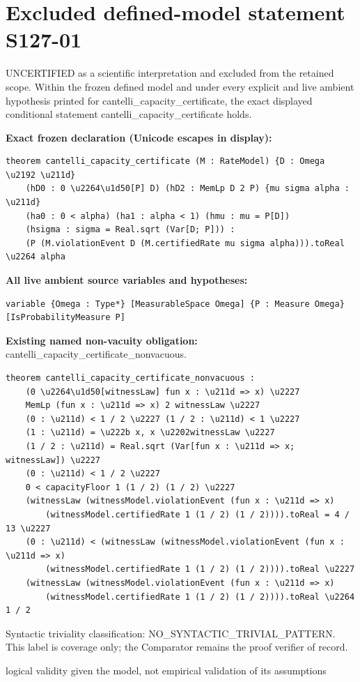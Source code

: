 \documentclass[11pt]{article}
\begin{document}
\section*{Excluded defined-model statement S127-01}
UNCERTIFIED as a scientific interpretation and excluded from the retained scope. Within the frozen defined model and under every explicit and live ambient hypothesis printed for cantelli\_\allowbreak{}capacity\_\allowbreak{}certificate, the exact displayed conditional statement cantelli\_\allowbreak{}capacity\_\allowbreak{}certificate holds.
\par\noindent\textbf{Exact frozen declaration (Unicode escapes in display):}
\begin{Verbatim}[breaklines=true,breakanywhere=true,fontsize=\scriptsize]
theorem cantelli_capacity_certificate (M : RateModel) {D : Omega \u2192 \u211d}
    (hD0 : 0 \u2264\u1d50[P] D) (hD2 : MemLp D 2 P) {mu sigma alpha : \u211d}
    (ha0 : 0 < alpha) (ha1 : alpha < 1) (hmu : mu = P[D])
    (hsigma : sigma = Real.sqrt (Var[D; P])) :
    (P (M.violationEvent D (M.certifiedRate mu sigma alpha))).toReal \u2264 alpha
\end{Verbatim}
\noindent\textbf{All live ambient source variables and hypotheses:}
\begin{Verbatim}[breaklines=true,breakanywhere=true,fontsize=\scriptsize]
variable {Omega : Type*} [MeasurableSpace Omega] {P : Measure Omega} [IsProbabilityMeasure P]
\end{Verbatim}
\noindent\textbf{Existing named non-vacuity obligation:} cantelli\_\allowbreak{}capacity\_\allowbreak{}certificate\_\allowbreak{}nonvacuous.
\begin{Verbatim}[breaklines=true,breakanywhere=true,fontsize=\scriptsize]
theorem cantelli_capacity_certificate_nonvacuous :
    (0 \u2264\u1d50[witnessLaw] fun x : \u211d => x) \u2227
    MemLp (fun x : \u211d => x) 2 witnessLaw \u2227
    (0 : \u211d) < 1 / 2 \u2227 (1 / 2 : \u211d) < 1 \u2227
    (1 : \u211d) = \u222b x, x \u2202witnessLaw \u2227
    (1 / 2 : \u211d) = Real.sqrt (Var[fun x : \u211d => x; witnessLaw]) \u2227
    (0 : \u211d) < 1 / 2 \u2227
    0 < capacityFloor 1 (1 / 2) (1 / 2) \u2227
    (witnessLaw (witnessModel.violationEvent (fun x : \u211d => x)
        (witnessModel.certifiedRate 1 (1 / 2) (1 / 2)))).toReal = 4 / 13 \u2227
    (0 : \u211d) < (witnessLaw (witnessModel.violationEvent (fun x : \u211d => x)
        (witnessModel.certifiedRate 1 (1 / 2) (1 / 2)))).toReal \u2227
    (witnessLaw (witnessModel.violationEvent (fun x : \u211d => x)
        (witnessModel.certifiedRate 1 (1 / 2) (1 / 2)))).toReal \u2264 1 / 2
\end{Verbatim}
\noindent Syntactic triviality classification: NO\_\allowbreak{}SYNTACTIC\_\allowbreak{}TRIVIAL\_\allowbreak{}PATTERN. This label is coverage only; the Comparator remains the proof verifier of record.
\par\noindent logical validity given the model, not empirical validation of its assumptions
\end{document}
